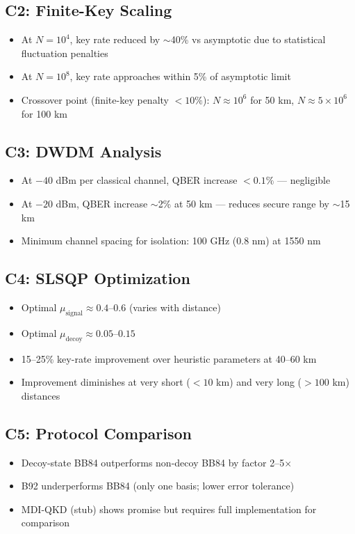 \documentclass[11pt,a4paper,oneside]{report}
\begin{document}
\subsection{C2: Finite-Key Scaling}
\begin{itemize}
\item At $N = 10^4$, key rate reduced by $\sim$40\% vs asymptotic due to statistical fluctuation penalties
\item At $N = 10^8$, key rate approaches within 5\% of asymptotic limit
\item Crossover point (finite-key penalty $< 10\%$): $N \approx 10^6$ for 50 km, $N \approx 5 \times 10^6$ for 100 km
\end{itemize}

\subsection{C3: DWDM Analysis}
\begin{itemize}
\item At $-40$ dBm per classical channel, QBER increase $< 0.1\%$ — negligible
\item At $-20$ dBm, QBER increase $\sim$2\% at 50 km — reduces secure range by $\sim$15 km
\item Minimum channel spacing for isolation: 100 GHz (0.8 nm) at 1550 nm
\end{itemize}

\subsection{C4: SLSQP Optimization}
\begin{itemize}
\item Optimal $\mu_{\text{signal}} \approx 0.4$–$0.6$ (varies with distance)
\item Optimal $\mu_{\text{decoy}} \approx 0.05$–$0.15$
\item 15–25\% key-rate improvement over heuristic parameters at 40–60 km
\item Improvement diminishes at very short ($< 10$ km) and very long ($> 100$ km) distances
\end{itemize}

\subsection{C5: Protocol Comparison}
\begin{itemize}
\item Decoy-state BB84 outperforms non-decoy BB84 by factor 2–5$\times$
\item B92 underperforms BB84 (only one basis; lower error tolerance)
\item MDI-QKD (stub) shows promise but requires full implementation for comparison
\end{itemize}
\end{document}
